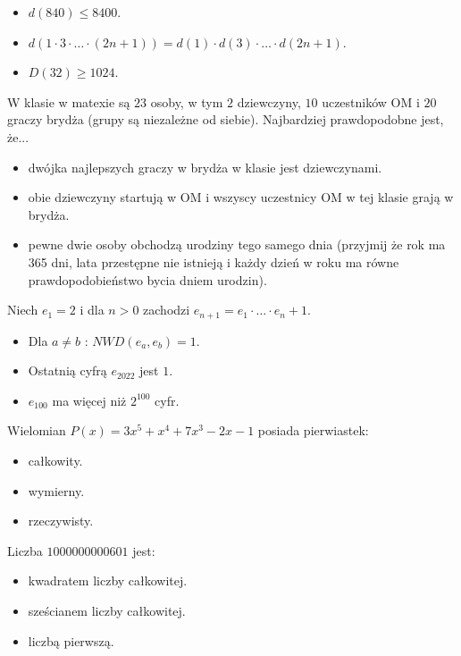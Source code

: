 \documentclass[12pt, a4paper]{article}
\newcommand{\question}[1]{\normalitem \begin{samepage}#1 \end{samepage}}
\newcommand{\questionwithasterix}[1]{ \asterixitem \begin{samepage}#1 \vspace{6cm}\end{samepage}}
\begin{document}
\begin{enumerate}
{		\begin{itemize}
			\item $d(840) \leq 8400$.
			\item $d(1 \cdot 3 \cdot \ldots \cdot (2n+1)) = d(1) \cdot d(3) \cdot \ldots \cdot d(2n+1)$.
			\item $D(32) \geq 1024$.
		\end{itemize}
	}
	
	\question {
		W klasie w matexie są $23$ osoby, w tym $2$ dziewczyny, $10$ uczestników OM i $20$ graczy brydża (grupy są niezależne od siebie). Najbardziej prawdopodobne jest, że...
		
		\begin{itemize}
			\item dwójka najlepszych graczy w brydża w klasie jest dziewczynami.
			\item obie dziewczyny startują w OM i wszyscy uczestnicy OM w tej klasie grają w brydża.
			\item pewne dwie osoby obchodzą urodziny tego samego dnia (przyjmij że rok ma 365 dni, lata przestępne nie istnieją i każdy dzień w roku ma równe prawdopodobieństwo bycia dniem urodzin).
		\end{itemize}
	}
	
	\questionwithasterix {
		Niech $e_1 = 2$ i dla $n>0$ zachodzi $e_{n+1} = e_1 \cdot \ldots \cdot e_n + 1$.
    
    	\begin{itemize}
			\item Dla $a \ne b$ : $NWD(e_a, e_b) = 1$.
			\item Ostatnią cyfrą $e_{2022}$ jest $1$.
			\item $e_{100}$ ma więcej niż $2^{100}$ cyfr.
		\end{itemize}
	}
	
	\question {
		Wielomian $P(x) = 3x^5+x^4+7x^3-2x-1$ posiada pierwiastek:
	
		\begin{itemize}
			\item całkowity.
			\item wymierny.
			\item rzeczywisty.
		\end{itemize}
	}
	
	\question {
		Liczba $1000000000601$ jest:
	
		\begin{itemize}
			\item kwadratem liczby całkowitej.
			\item sześcianem liczby całkowitej.
			\item liczbą pierwszą.
		\end{itemize}
	}
	

\end{enumerate}
\end{document}
